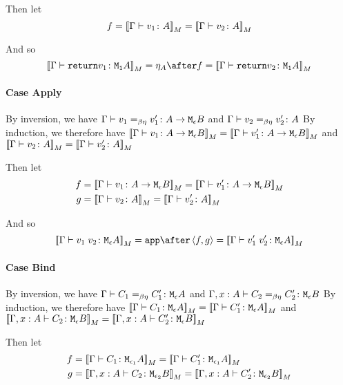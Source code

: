 {    Then let
    \begin{equation}
        f = {\bf [\![}\Gamma \vdash v_1 \colon A{\bf ]\!]}_M = {\bf [\![}\Gamma \vdash v_2 \colon A{\bf ]\!]}_M
    \end{equation}

    And so
    \begin{equation}
        \deno{\gtyperelation{\return{v_1}}{\M{\1}{A}}} = \point{A}\after f = \deno{\gtyperelation{\return{v_2}}{\M{\1}{A}}}
    \end{equation}


    \paragraph{Case Apply}
    By inversion, we have $\Gamma \vdash v_1 =_{\beta\eta} v_1' \colon A \rightarrow \texttt{M}_{\epsilon}{B}$ and $\Gamma \vdash v_2 =_{\beta\eta} v_2' \colon A$
    By induction, we therefore have ${\bf [\![}\Gamma \vdash v_1 \colon A \rightarrow \texttt{M}_{\epsilon}{B}{\bf ]\!]}_M= {\bf [\![}\Gamma \vdash v_1' \colon A \rightarrow \texttt{M}_{\epsilon}{B}{\bf ]\!]}_M$ and ${\bf [\![}\Gamma \vdash v_2 \colon A{\bf ]\!]}_M = {\bf [\![}\Gamma \vdash v_2' \colon A{\bf ]\!]}_M$

    Then let
    \begin{align}
        f &{}= \deno{\gtyperelation{v_1}{\aeb}} = \deno{\gtyperelation{v_1'}{\aeb}}\\
        g &{}= \deno{\gtyperelation{v_2}{A}} = \deno{\gtyperelation{v_2'}{A}}
    \end{align}



    And so
    \begin{equation}
        \deno{\gtyperelation{\apply{v_1}{v_2}}{\M{\e}{A}}} = \app\after\pr{f}{g} = \deno{\gtyperelation{\apply{v_1'}{v_2'}}{\M{\e}{A}}}
    \end{equation}


    \paragraph{Case Bind}
    By inversion, we have $\Gamma \vdash C_1 =_{\beta\eta} C_1' \colon \texttt{M}_{\epsilon}{A}$ and $\Gamma, x: A \vdash C_2 =_{\beta\eta} C_2' \colon \texttt{M}_{\epsilon}{B}$
    By induction, we therefore have ${\bf [\![}\Gamma \vdash C_1 \colon \texttt{M}_{\epsilon}{A}{\bf ]\!]}_M= {\bf [\![}\Gamma \vdash C_1' \colon \texttt{M}_{\epsilon}{A}{\bf ]\!]}_M$ and ${\bf [\![}\Gamma, x: A \vdash C_2 \colon \texttt{M}_{\epsilon}{B}{\bf ]\!]}_M = {\bf [\![}\Gamma, x: A \vdash C_2' \colon \texttt{M}_{\epsilon}{B}{\bf ]\!]}_M$

    Then let
    \begin{align}
        f &{}=\deno{\gtyperelation{C_1}{\M{\e_1}{A}}}= \deno{\gtyperelation{C_1'}{\M{\e_1}{A}}}\\
        g &{}=\deno{\typerelation{\gax}{C_2}{\M{\e_2}{B}}} = \deno{\typerelation{\gax}{C_2'}{\M{\e_2}{B}}}
    \end{align}



}
